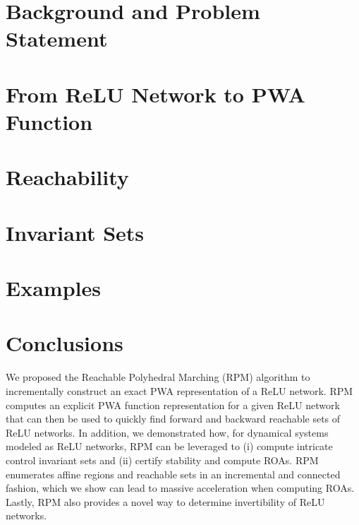 \documentclass[letterpaper, 10 pt, conference]{ieeeconf}  %
\begin{document}
\section{Background and Problem Statement}
\label{Sec:Background}


\section{From ReLU Network to PWA Function}
\label{Sec:PWA}


\section{Reachability} 
\label{Sec:Reachability}


% 

\section{Invariant Sets}
\label{Sec:ROA}


\section{Examples} 
\label{Sec:Examples}


\section{Conclusions}
\label{Sec:Conclusions}
We proposed the Reachable Polyhedral Marching (RPM) algorithm to incrementally construct an exact PWA representation of a ReLU network. 
RPM computes an explicit PWA function representation for a given ReLU network that can then be used to quickly find forward and backward reachable sets of ReLU networks. 
In addition, we demonstrated how, for dynamical systems modeled as ReLU networks, RPM can be leveraged to (i) compute intricate control invariant sets and (ii) certify stability and compute ROAs. 
RPM enumerates affine regions and reachable sets in an incremental and connected fashion, which we show can lead to massive acceleration when computing ROAs.
Lastly, RPM also provides a novel way to determine invertibility of ReLU networks.
\end{document}
